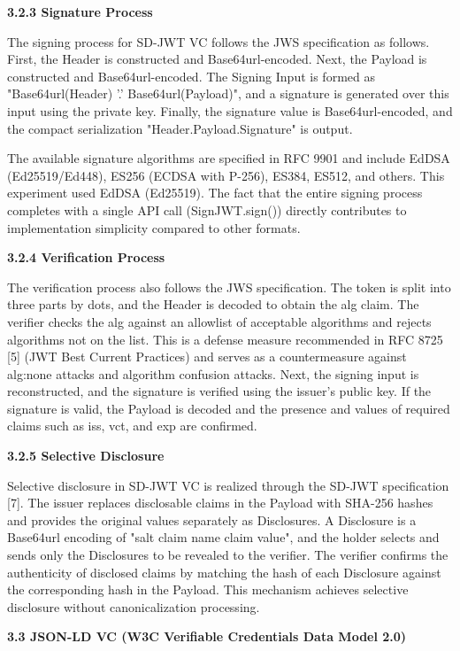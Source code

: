 \textbf{3.2.3 Signature Process}

The signing process for SD-JWT VC follows the JWS specification as follows. First, the Header is constructed and Base64url-encoded. Next, the Payload is constructed and Base64url-encoded. The Signing Input is formed as "Base64url(Header) \textbar\textbar{} '.' \textbar\textbar{} Base64url(Payload)", and a signature is generated over this input using the private key. Finally, the signature value is Base64url-encoded, and the compact serialization "Header.Payload.Signature" is output.

The available signature algorithms are specified in RFC 9901 and include EdDSA (Ed25519/Ed448), ES256 (ECDSA with P-256), ES384, ES512, and others. This experiment used EdDSA (Ed25519). The fact that the entire signing process completes with a single API call (SignJWT.sign()) directly contributes to implementation simplicity compared to other formats.

\textbf{3.2.4 Verification Process}

The verification process also follows the JWS specification. The token is split into three parts by dots, and the Header is decoded to obtain the alg claim. The verifier checks the alg against an allowlist of acceptable algorithms and rejects algorithms not on the list. This is a defense measure recommended in RFC 8725 {[}5{]} (JWT Best Current Practices) and serves as a countermeasure against alg:none attacks and algorithm confusion attacks. Next, the signing input is reconstructed, and the signature is verified using the issuer's public key. If the signature is valid, the Payload is decoded and the presence and values of required claims such as iss, vct, and exp are confirmed.

\textbf{3.2.5 Selective Disclosure}

Selective disclosure in SD-JWT VC is realized through the SD-JWT specification {[}7{]}. The issuer replaces disclosable claims in the Payload with SHA-256 hashes and provides the original values separately as Disclosures. A Disclosure is a Base64url encoding of "salt \textbar\textbar{} claim name \textbar\textbar{} claim value", and the holder selects and sends only the Disclosures to be revealed to the verifier. The verifier confirms the authenticity of disclosed claims by matching the hash of each Disclosure against the corresponding hash in the Payload. This mechanism achieves selective disclosure without canonicalization processing.

\textbf{3.3 JSON-LD VC (W3C Verifiable Credentials Data Model 2.0)}

